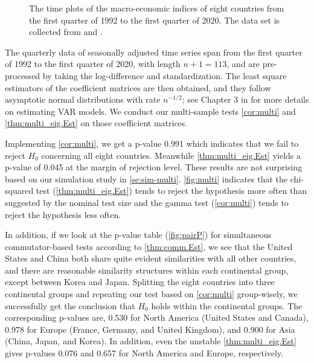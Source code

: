 \documentclass[12pt]{article}
\numberwithin{thm}{section}
\numberwithin{defn}{section}
\numberwithin{lem}{section}
\numberwithin{prop}{section}
\numberwithin{cor}{section}
\numberwithin{rem}{section}
\begin{document}

\begin{figure}[htbp] %
    \centering
    \centerline{}
    \caption{The time plots of the macro-economic indices of eight countries from the first quarter of 1992 to the first quarter of 2020. The data set is collected from \cite{ceic} and \cite{oecd}.}
    \label{fig:VAR1_eg}
\end{figure}

The quarterly data of seasonally adjusted time series span from the first quarter of 1992 to the first quarter of 2020, with length $n+1 = 113$, and are pre-processed by taking the log-difference and standardization. The least square estimators of the coefficient matrices are then obtained, and they follow asymptotic normal distributions with rate $n^{-1/2}$; see Chapter 3 in \cite{Lutkepol2005} for more details on estimating VAR models. We conduct our multi-sample tests \autoref{cor:multi} and \autoref{thm:multi_eig.Est} on those coefficient matrices.

Implementing \autoref{cor:multi}, we get a p-value 0.991 which indicates that we fail to reject $H_0$ concerning all eight countries. Meanwhile \autoref{thm:multi_eig.Est} yields a p-value of 0.045 at the margin of rejection level. 
These results are not surprising based on our simulation study in \autoref{se:sim-multi}. \autoref{fig:multi} indicates that the chi-squared test (\autoref{thm:multi_eig.Est}) tends to reject the hypothesis more often than suggested by the nominal test size and the gamma test (\autoref{cor:multi}) tends to reject the hypothesis less often.

In addition, if we look at the p-value table (\autoref{fig:pairP}) for simultaneous commutator-based tests according to \autoref{thm:comm.Est}, we see that the United States and China both share quite evident similarities with all other countries, and there are reasonable similarity structures within each continental group, except between Korea and Japan. Splitting the eight countries into three continental groups and repeating our test based on \autoref{cor:multi} group-wisely, we successfully get the conclusion that $H_0$ holds within the continental groups. The corresponding p-values are, 0.530 for North America (United States and Canada), 0.978 for Europe (France, Germany, and United Kingdom), and 0.900 for Asia (China, Japan, and Korea). In addition, even the unstable \autoref{thm:multi_eig.Est} gives p-values 0.076 and 0.657 for North America and Europe, respectively.
\end{document}
